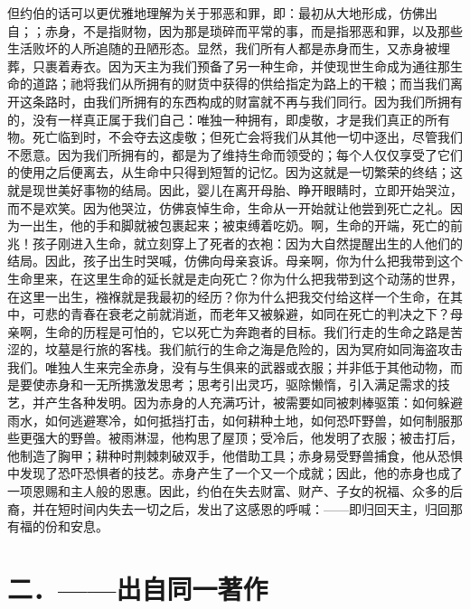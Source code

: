 但约伯的话可以更优雅地理解为关于邪恶和罪，即：最初从大地形成，仿佛出自；；赤身，不是指财物，因为那是琐碎而平常的事，而是指邪恶和罪，以及那些生活败坏的人所追随的丑陋形态。显然，我们所有人都是赤身而生，又赤身被埋葬，只裹着寿衣。因为天主为我们预备了另一种生命，并使现世生命成为通往那生命的道路；祂将我们从所拥有的财货中获得的供给指定为路上的干粮；而当我们离开这条路时，由我们所拥有的东西构成的财富就不再与我们同行。因为我们所拥有的，没有一样真正属于我们自己：唯独一种拥有，即虔敬，才是我们真正的所有物。死亡临到时，不会夺去这虔敬；但死亡会将我们从其他一切中逐出，尽管我们不愿意。因为我们所拥有的，都是为了维持生命而领受的；每个人仅仅享受了它们的使用之后便离去，从生命中只得到短暂的记忆。因为这就是一切繁荣的终结；这就是现世美好事物的结局。因此，婴儿在离开母胎、睁开眼睛时，立即开始哭泣，而不是欢笑。因为他哭泣，仿佛哀悼生命，生命从一开始就让他尝到死亡之礼。因为一出生，他的手和脚就被包裹起来；被束缚着吃奶。啊，生命的开端，死亡的前兆！孩子刚进入生命，就立刻穿上了死者的衣袍：因为大自然提醒出生的人他们的结局。因此，孩子出生时哭喊，仿佛向母亲哀诉。母亲啊，你为什么把我带到这个生命里来，在这里生命的延长就是走向死亡？你为什么把我带到这个动荡的世界，在这里一出生，襁褓就是我最初的经历？你为什么把我交付给这样一个生命，在其中，可悲的青春在衰老之前就消逝，而老年又被躲避，如同在死亡的判决之下？母亲啊，生命的历程是可怕的，它以死亡为奔跑者的目标。我们行走的生命之路是苦涩的，坟墓是行旅的客栈。我们航行的生命之海是危险的，因为冥府如同海盗攻击我们。唯独人生来完全赤身，没有与生俱来的武器或衣服；并非低于其他动物，而是要使赤身和一无所携激发思考；思考引出灵巧，驱除懒惰，引入满足需求的技艺，并产生各种发明。因为赤身的人充满巧计，被需要如同被刺棒驱策：如何躲避雨水，如何逃避寒冷，如何抵挡打击，如何耕种土地，如何恐吓野兽，如何制服那些更强大的野兽。被雨淋湿，他构思了屋顶；受冷后，他发明了衣服；被击打后，他制造了胸甲；耕种时荆棘刺破双手，他借助工具；赤身易受野兽捕食，他从恐惧中发现了恐吓恐惧者的技艺。赤身产生了一个又一个成就；因此，他的赤身也成了一项恩赐和主人般的恩惠。因此，约伯在失去财富、财产、子女的祝福、众多的后裔，并在短时间内失去一切之后，发出了这感恩的呼喊：——即归回天主，归回那有福的份和安息。\par


\section{二．——出自同一著作}

